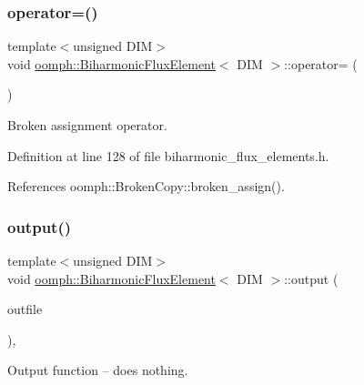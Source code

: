 \subsubsection{\texorpdfstring{operator=()}{operator=()}}
{\footnotesize\ttfamily template$<$unsigned D\+IM$>$ \\
void \hyperlink{classoomph_1_1BiharmonicFluxElement}{oomph\+::\+Biharmonic\+Flux\+Element}$<$ D\+IM $>$\+::operator= (\begin{DoxyParamCaption}\item[{const \hyperlink{classoomph_1_1BiharmonicFluxElement}{Biharmonic\+Flux\+Element}$<$ D\+IM $>$ \&}]{ }\end{DoxyParamCaption})\hspace{0.3cm}{\ttfamily [inline]}}



Broken assignment operator. 



Definition at line 128 of file biharmonic\+\_\+flux\+\_\+elements.\+h.



References oomph\+::\+Broken\+Copy\+::broken\+\_\+assign().

\mbox{\label{classoomph_1_1BiharmonicFluxElement_a04c4c197b9a2e0be02a9c84a5c6d6e2a}} 
\subsubsection{\texorpdfstring{output()}{output()}\hspace{0.1cm}{\footnotesize\ttfamily [1/4]}}
{\footnotesize\ttfamily template$<$unsigned D\+IM$>$ \\
void \hyperlink{classoomph_1_1BiharmonicFluxElement}{oomph\+::\+Biharmonic\+Flux\+Element}$<$ D\+IM $>$\+::output (\begin{DoxyParamCaption}\item[{std\+::ostream \&}]{outfile }\end{DoxyParamCaption})\hspace{0.3cm}{\ttfamily [inline]}, {\ttfamily [virtual]}}



Output function -- does nothing. 



